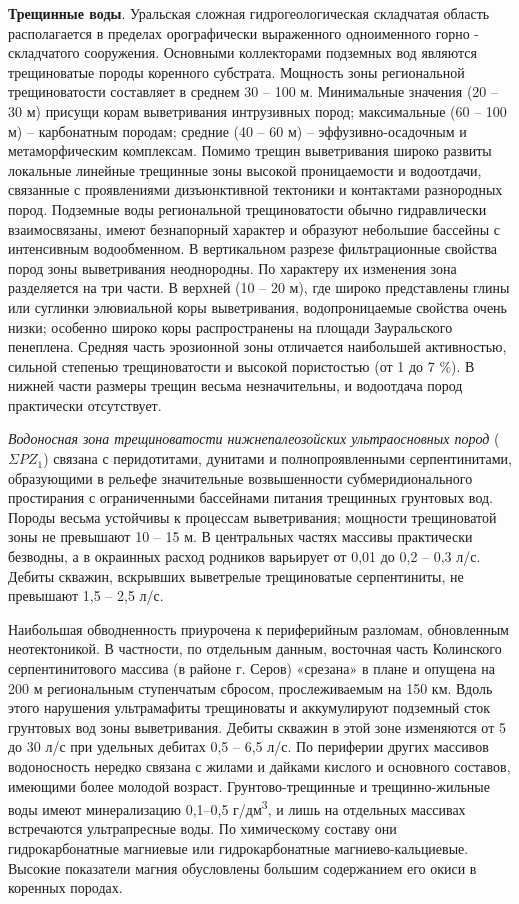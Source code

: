 \textbf{Трещинные воды}. Уральская сложная гидрогеологическая складчатая область располагается в пределах орографически выраженного одноименного горно - складчатого сооружения. Основными коллекторами подземных вод являются трещиноватые породы коренного субстрата. Мощность зоны региональной трещиноватости составляет в среднем 30 – 100 м. Минимальные значения (20 – 30 м) присущи корам выветривания интрузивных пород; максимальные (60 – 100 м) – карбонатным породам; средние (40 – 60 м) – эффузивно-осадочным и метаморфическим комплексам. Помимо трещин выветривания широко развиты локальные линейные трещинные зоны высокой проницаемости и водоотдачи, связанные с проявлениями дизъюнктивной тектоники и контактами разнородных пород. Подземные воды региональной трещиноватости обычно гидравлически взаимосвязаны, имеют безнапорный характер и образуют небольшие бассейны с интенсивным водообменном. В вертикальном разрезе фильтрационные свойства пород зоны выветривания неоднородны. По характеру их изменения зона разделяется на три части. В верхней (10 – 20 м), где широко представлены глины или суглинки элювиальной коры выветривания, водопроницаемые свойства очень низки; особенно широко коры распространены на площади Зауральского пенеплена. Средняя часть эрозионной зоны отличается наибольшей активностью, сильной степенью трещиноватости и высокой пористостью (от 1 до 7 \%). В нижней части размеры трещин весьма незначительны, и водоотдача пород практически отсутствует.

\textit{Водоносная зона трещиноватости нижнепалеозойских ультраосновных пород} ($\Sigma PZ_1$)
связана с перидотитами, дунитами и полнопроявленными серпентинитами, образующими в рельефе значительные возвышенности субмеридионального простирания с ограниченными бассейнами питания трещинных грунтовых вод. Породы весьма устойчивы к процессам выветривания; мощности трещиноватой зоны не превышают 10 – 15 м. В центральных частях массивы практически безводны, а в окраинных расход родников варьирует от 0,01 до 0,2 – 0,3 л/с. Дебиты скважин, вскрывших выветрелые трещиноватые серпентиниты, не превышают 1,5 – 2,5 л/с.

Наибольшая обводненность приурочена к периферийным разломам, обновленным неотектоникой. В частности, по отдельным данным, восточная часть Колинского серпентинитового массива (в районе г. Серов) «срезана» в плане и опущена на 200 м региональным ступенчатым сбросом, прослеживаемым на 150 км. Вдоль этого нарушения ультрамафиты трещиноваты и аккумулируют подземный сток грунтовых вод зоны выветривания. Дебиты
скважин в этой зоне изменяются от 5 до 30 л/с при удельных дебитах 0,5 – 6,5 л/с. По периферии других массивов водоносность нередко связана с жилами и дайками кислого и основного составов, имеющими более молодой возраст. Грунтово-трещинные и трещинно-жильные воды имеют минерализацию 0,1–0,5 г/дм\textsuperscript{3}, и лишь на отдельных массивах встречаются ультрапресные воды. По химическому составу они гидрокарбонатные магниевые или гидрокарбонатные магниево-кальциевые. Высокие показатели магния обусловлены большим содержанием его окиси в коренных породах.

